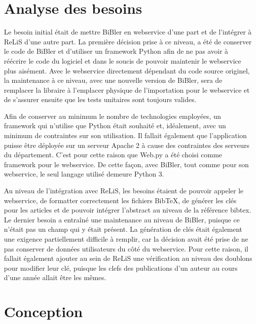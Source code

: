 \documentclass[12pt,titlepage]{article}
\let\oldsection\section
\renewcommand\section{\clearpage\oldsection}
\begin{document}
\section{Analyse des besoins}
Le besoin initial était de mettre BiBler en webservice d'une part et de l'intégrer à ReLiS d'une autre part. La première décision prise à ce niveau, a été de conserver le code de BiBler et d'utiliser un framework Python afin de ne pas avoir à réécrire le code du logiciel et dans le soucis de pouvoir maintenir le webservice plus aisément. Avec le webservice directement dépendant du code source originel, la maintenance à ce niveau, avec une nouvelle version de BiBler, sera de remplacer la libraire à l'emplacer physique de l'importation pour le webservice et de s'assurer ensuite que les tests unitaires sont toujours valides. \newline

Afin de conserver au minimum le nombre de technologies employées, un framework qui n'utilise que Python était souhaité et, idéalement, avec un minimum de contraintes sur son utilisation. Il fallait également que l'application puisse être déployée sur un serveur Apache 2 à cause des contraintes des serveurs du département. C'est pour cette raison que Web.py \cite{Webpy1} a été choisi comme framework pour le webservice. De cette façon, avec BiBler, tout comme pour son webservice, le seul langage utilisé demeure Python 3. \newline

Au niveau de l'intégration avec ReLiS, les besoins étaient de pouvoir appeler le webservice, de formatter correctement les fichiers BibTeX, de générer les clés pour les articles et de pouvoir intégrer l'abstract au niveau de la référence bibtex. Le dernier besoin a entraîné une maintenance au niveau de BiBler, puisque ce n'était pas un champ qui y était présent. La génération de clés était également une exigence partiellement difficile à remplir, car la décision avait été prise de ne pas conserver de données utilisateurs du côté du webservice. Pour cette raison, il fallait également ajouter au sein de ReLiS une vérification au niveau des doublons pour modifier leur clé, puisque les clefs des publications d'un auteur au cours d'une année allait être les mêmes. \newline


\section{Conception}
\end{document}
